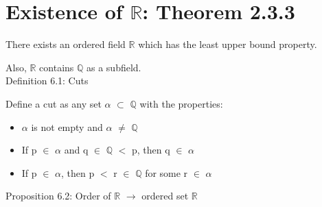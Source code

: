 \newpage
\section[Day 6: Existence of $\mathbb{R}$]
{Existence of $\mathbb{R}$: {\normalsize \color{red} Theorem 2.3.3}}

	\begin{adjustbox}{minipage=14cm, right, vspace=0.1cm 0cm}
		There exists an ordered field $\mathbb{R}$ which has the
		least upper bound property.

		Also, $\mathbb{R}$ contains $\mathbb{Q}$ as a subfield. \\
	\end{adjustbox}
	
{ \color{blue} Definition 6.1: Cuts }

	\begin{adjustbox}{minipage=14cm, right, vspace=0.1cm 0cm}
		Define a cut as any set $\alpha$ $\subset$ $\mathbb{Q}$ with the properties:
	\end{adjustbox}

	\begin{itemize}[leftmargin=1cm, itemsep=0.4em]
		\item $\alpha$ is not empty and $\alpha$ $\not =$ $\mathbb{Q}$
		
		\item If p $\in$ $\alpha$ and q $\in$ $\mathbb{Q}$ $<$ p,
			then q $\in$ $\alpha$
		
			\item If p $\in$ $\alpha$, then p $<$ r $\in$ $\mathbb{Q}$ for
			some r $\in$ $\alpha$ \\
	\end{itemize}

{ \color{blue} Proposition 6.2: Order of $\mathbb{R}$ $\rightarrow$ ordered set $\mathbb{R}$ }

